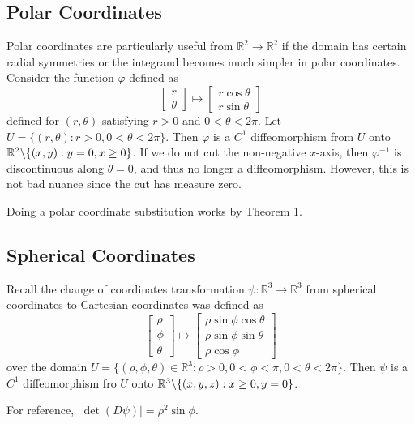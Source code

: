 \documentclass[11pt]{article}
\theoremstyle{definition}
\newcommand{\R}{\mathbb{R}}                      %
\newcommand{\bslash}{\symbol{92}}
\newcommand{\mat}{\begin{bmatrix}}
\newcommand{\trix}{\end{bmatrix}}
\begin{document}
\subsection{Polar Coordinates}
 Polar coordinates are particularly useful from $\R^2\to \R^2$ if the domain has certain radial symmetries or the integrand becomes much simpler in polar coordinates. Consider the function $\varphi$ defined as
 $$
 \mat r \\ \theta \trix \mapsto \mat r\cos\theta \\ r\sin\theta \trix
 $$
defined for $(r,\theta)$ satisfying $r>0$ and $0<\theta<2\pi$. Let $U=\{(r,\theta):r>0,0<\theta<2\pi\}$. Then $\varphi$ is a $C^1$ diffeomorphism from $U$ onto $\R^2\bslash\{(x,y):y=0, x\geq 0\}$. If we do not cut the non-negative $x$-axis, then $\varphi^{-1}$ is discontinuous along $\theta = 0$, and thus no longer a diffeomorphism. However, this is not bad nuance since the cut has measure zero.

Doing a polar coordinate substitution works by Theorem 1.


\subsection{Spherical Coordinates}

Recall the change of coordinates transformation $\psi:\R^3\to \R^3$ from spherical coordinates to Cartesian coordinates was defined as
$$
\mat \rho \\ \phi \\ \theta \trix \mapsto \mat \rho\sin\phi\cos\theta \\
\rho \sin\phi \sin\theta \\ \rho\cos\phi \trix
$$
over the domain $U=\{(\rho,\phi,\theta)\in\R^3 : \rho>0, 0<\phi<\pi , 0<\theta<2\pi\}$. Then $\psi$ is a $C^1$ diffeomorphism fro $U$ onto $\R^3\bslash \{(x,y,z):x\geq 0, y=0\}$.

For reference, $|\det(D\psi)|=\rho^2\sin\phi$.
\end{document}
